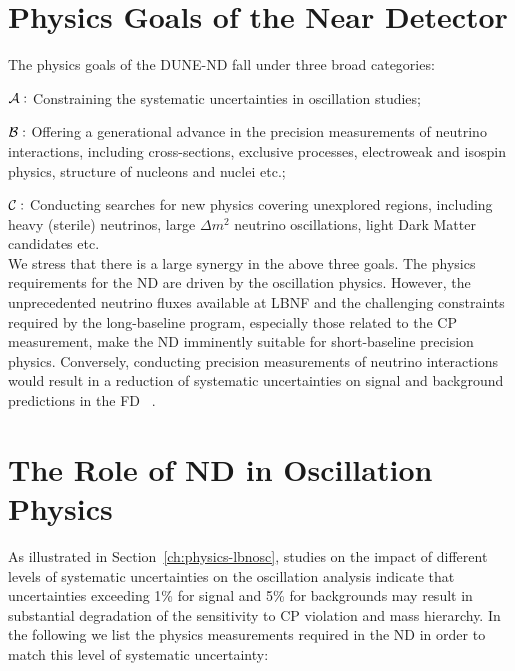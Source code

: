 
\section{Physics Goals of the Near Detector}
\label{sec:physics-nd-goals}

The physics goals of the DUNE-ND fall under three broad categories: 

\noindent
{\boldmath $ {\cal A:}$} Constraining the systematic uncertainties in  oscillation studies;  

\noindent
{\boldmath $ {\cal B:}$} Offering a generational advance in the precision measurements of neutrino interactions, including 
cross-sections, exclusive processes, electroweak and isospin physics, structure of nucleons and nuclei etc.;  

\noindent
{\boldmath $ {\cal C:}$} Conducting searches for new physics covering unexplored regions, 
including heavy (sterile) neutrinos, large $\Delta m^2$ neutrino oscillations, light Dark Matter 
candidates etc. \\
\noindent
We stress that there is a large synergy in the above three goals. The physics requirements for the ND are driven 
by the oscillation physics. However,  the unprecedented neutrino fluxes available at LBNF and the challenging 
constraints required by the long-baseline program, especially those related to the CP measurement,   make the ND imminently suitable for  short-baseline 
precision physics. Conversely, conducting precision measurements of neutrino 
interactions would result in a reduction of systematic uncertainties on signal and background 
predictions in the FD ~\cite{HIRESMNU, DPR, Adams:2013qkq}. 



\section{The Role of ND in Oscillation Physics}  
\label{sec-nd-oscl} 

As illustrated in Section~\ref{ch:physics-lbnosc}, studies on the impact of different levels of systematic 
uncertainties on the oscillation analysis indicate 
that uncertainties exceeding 1\% for signal and 5\% for backgrounds may result in 
substantial degradation of the sensitivity to CP violation and mass hierarchy. 
In the following we list the physics measurements required in the ND in order to 
match this level of systematic uncertainty:   

